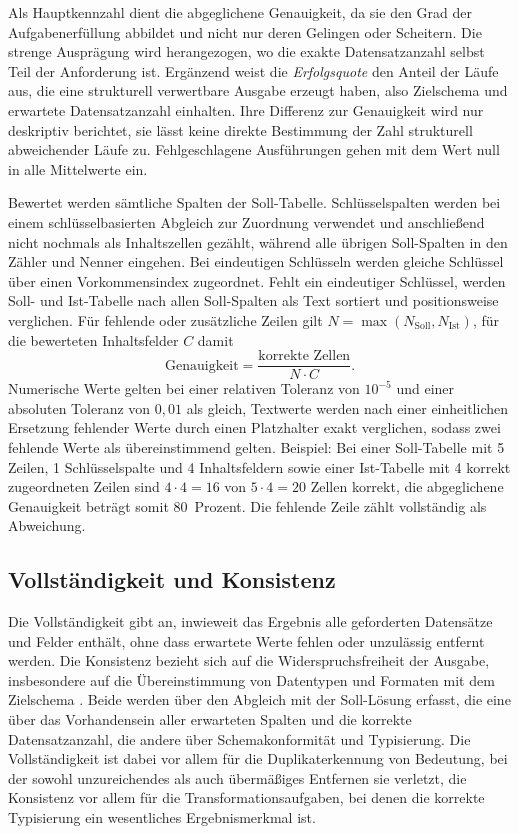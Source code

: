 Als Hauptkennzahl dient die abgeglichene Genauigkeit, da sie den Grad der Aufgabenerfüllung abbildet und nicht nur deren Gelingen oder Scheitern. Die strenge Ausprägung wird herangezogen, wo die exakte Datensatzanzahl selbst Teil der Anforderung ist. Ergänzend weist die \emph{Erfolgsquote} den Anteil der Läufe aus, die eine strukturell verwertbare Ausgabe erzeugt haben, also Zielschema und erwartete Datensatzanzahl einhalten. Ihre Differenz zur Genauigkeit wird nur deskriptiv berichtet, sie lässt keine direkte Bestimmung der Zahl strukturell abweichender Läufe zu. Fehlgeschlagene Ausführungen gehen mit dem Wert null in alle Mittelwerte ein.

Bewertet werden sämtliche Spalten der Soll-Tabelle. Schlüsselspalten werden bei einem schlüsselbasierten Abgleich zur Zuordnung verwendet und anschließend nicht nochmals als Inhaltszellen gezählt, während alle übrigen Soll-Spalten in den Zähler und Nenner eingehen. Bei eindeutigen Schlüsseln werden gleiche Schlüssel über einen Vorkommensindex zugeordnet. Fehlt ein eindeutiger Schlüssel, werden Soll- und Ist-Tabelle nach allen Soll-Spalten als Text sortiert und positionsweise verglichen. Für fehlende oder zusätzliche Zeilen gilt $N=\max(N_{\mathrm{Soll}},N_{\mathrm{Ist}})$, für die bewerteten Inhaltsfelder $C$ damit
\[
    \mathrm{Genauigkeit}=\frac{\text{korrekte Zellen}}{N\cdot C}.
\]
Numerische Werte gelten bei einer relativen Toleranz von $10^{-5}$ und einer absoluten Toleranz von $0{,}01$ als gleich, Textwerte werden nach einer einheitlichen Ersetzung fehlender Werte durch einen Platzhalter exakt verglichen, sodass zwei fehlende Werte als übereinstimmend gelten. Beispiel: Bei einer Soll-Tabelle mit 5 Zeilen, 1 Schlüsselspalte und 4 Inhaltsfeldern sowie einer Ist-Tabelle mit 4 korrekt zugeordneten Zeilen sind $4\cdot4=16$ von $5\cdot4=20$ Zellen korrekt, die abgeglichene Genauigkeit beträgt somit 80~Prozent. Die fehlende Zeile zählt vollständig als Abweichung.

\subsection{Vollständigkeit und Konsistenz}
\label{subsec:vollstaendigkeit}

Die Vollständigkeit gibt an, inwieweit das Ergebnis alle geforderten Datensätze und Felder enthält, ohne dass erwartete Werte fehlen oder unzulässig entfernt werden. Die Konsistenz bezieht sich auf die Widerspruchsfreiheit der Ausgabe, insbesondere auf die Übereinstimmung von Datentypen und Formaten mit dem Zielschema \autocite{ridzuanReviewDataQuality2024,rangineniReviewEnhancingData2023}. Beide werden über den Abgleich mit der Soll-Lösung erfasst, die eine über das Vorhandensein aller erwarteten Spalten und die korrekte Datensatzanzahl, die andere über Schemakonformität und Typisierung. Die Vollständigkeit ist dabei vor allem für die Duplikaterkennung von Bedeutung, bei der sowohl unzureichendes als auch übermäßiges Entfernen sie verletzt, die Konsistenz vor allem für die Transformationsaufgaben, bei denen die korrekte Typisierung ein wesentliches Ergebnismerkmal ist.

